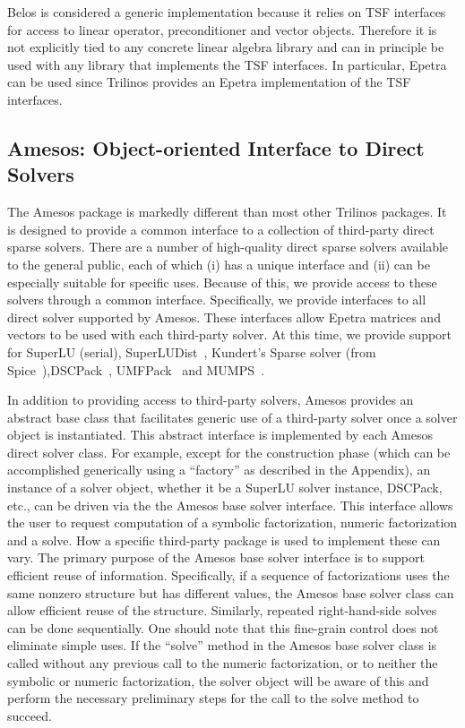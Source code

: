 \documentclass[12pt,relax]{TrilinosOverview}
\begin{document}
Belos is considered a generic implementation because it relies on TSF
interfaces for access to linear operator, preconditioner and vector
objects.  Therefore it is not explicitly tied to any concrete linear
algebra library and can in principle be used with any library that
implements the TSF interfaces.  In particular, Epetra can be used
since Trilinos provides an Epetra implementation of the TSF
interfaces.

\subsection{Amesos: Object-oriented Interface to Direct Solvers}

The Amesos package is markedly different than most other Trilinos
packages.  It is designed to provide a common interface to a
collection of third-party direct sparse solvers.
There are a number of high-quality direct sparse
solvers available to the general public, each of which (i) has a unique
interface and (ii) can be especially suitable for specific uses.
Because of this, we provide access to these solvers through a common
interface.  Specifically, we provide interfaces to all direct solver
supported by Amesos.  These interfaces allow Epetra matrices and
vectors to be used with each third-party solver.  At this time, we
provide support for SuperLU (serial), SuperLUDist~\cite{superlu-home-page}, 
Kundert's Sparse solver (from
Spice~\cite{spice-home-page}),DSCPack~\cite{dscpack-home-page}, UMFPack~\cite{umfpack-home-page}
and MUMPS~\cite{mumps-home-page}.

In addition to providing access to third-party solvers, Amesos
provides an abstract base class that facilitates generic use of a
third-party solver once a solver object is instantiated.  This
abstract interface is implemented by each Amesos direct solver class.
For example, except for the construction phase (which can be
accomplished generically using a ``factory'' as described in the
Appendix), an instance of a solver object,
whether it be a SuperLU solver instance, DSCPack, etc., can be driven
via the the Amesos base solver interface.  This interface allows the
user to request computation of a symbolic factorization, numeric
factorization and a solve.  How a specific third-party package is used
to implement these can vary.  The primary purpose of the Amesos base
solver interface is to support efficient reuse of information.
Specifically, if a sequence of factorizations uses the same nonzero
structure but has different values, the Amesos base solver class can
allow efficient reuse of the structure.  Similarly, repeated
right-hand-side solves can be done sequentially.  One should note that
this fine-grain control does not eliminate simple uses.  If the
``solve'' method in the Amesos base solver class is called without any
previous call to the numeric factorization, or to neither the symbolic
or numeric factorization, the solver object will be aware of this and
perform the necessary preliminary steps for the call to the solve
method to succeed.
\end{document}
